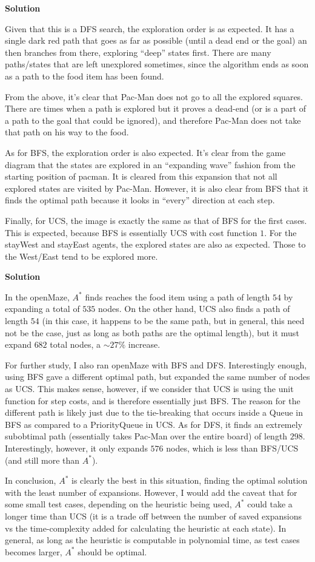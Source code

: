 \documentclass[11pt]{article}
\newcounter{AnswerCounter}
\newcounter{SubAnswerCounter}
\newenvironment{answer}[0]{
  \setcounter{SubAnswerCounter}{1}
  \bigskip
  \textbf{Solution \arabic{AnswerCounter}}
  \\
  \begin{small}
}{
  \end{small}
  \stepcounter{AnswerCounter}
}
\begin{document}
\begin{answer}
Given that this is a DFS search, the exploration order is as expected. It has a single dark red path that goes as far as possible (until a dead end or the goal) an then branches from there, exploring ``deep'' states first. There are many paths/states that are left unexplored sometimes, since the algorithm ends as soon as a path to the food item has been found.

From the above, it's clear that Pac-Man does not go to all the explored squares. There are times when a path is explored but it proves a dead-end (or is a part of a path to the goal that could be ignored), and therefore Pac-Man does not take that path on his way to the food.

As for BFS, the exploration order is also expected. It's clear from the game diagram that the states are explored in an ``expanding wave'' fashion from the starting position of pacman. It is cleared from this expansion that not all explored states are visited by Pac-Man. However, it is also clear from BFS that it finds the optimal path because it looks in ``every'' direction at each step.

Finally, for UCS, the image is exactly the same as that of BFS for the first cases. This is expected, because BFS is essentially UCS with cost function $1$. For the stayWest and stayEast agents, the explored states are also as expected. Those to the West/East tend to be explored more.
\end{answer}

\begin{answer}
In the openMaze, $A^*$ finds reaches the food item using a path of length $54$ by expanding a total of $535$ nodes. On the other hand, UCS also finds a path of length $54$ (in this case, it happens to be the same path, but in general, this need not be the case, just as long as both paths are the optimal length), but it must expand $682$ total nodes, a $\sim 27\%$ increase.

For further study, I also ran openMaze with BFS and DFS. Interestingly enough, using BFS gave a different optimal path, but expanded the same number of nodes as UCS. This makes sense, however, if we consider that UCS is using the unit function for step costs, and is therefore essentially just BFS. The reason for the different path is likely just due to the tie-breaking that occurs inside a Queue in BFS as compared to a PriorityQueue in UCS. As for DFS, it finds an extremely subobtimal path (essentially takes Pac-Man over the entire board) of length $298$. Interestingly, however, it only expands $576$ nodes, which is less than BFS/UCS (and still more than $A^*$).

In conclusion, $A^*$ is clearly the best in this situation, finding the optimal solution with the least number of expansions. However, I would add the caveat that for some small test cases, depending on the heuristic being used, $A^*$ could take a longer time than UCS (it is a trade off between the number of saved expansions vs the time-complexity added for calculating the heuristic at each state). In general, as long as the heuristic is computable in polynomial time, as test cases becomes larger, $A^*$ should be optimal.
\end{answer}
\end{document}
